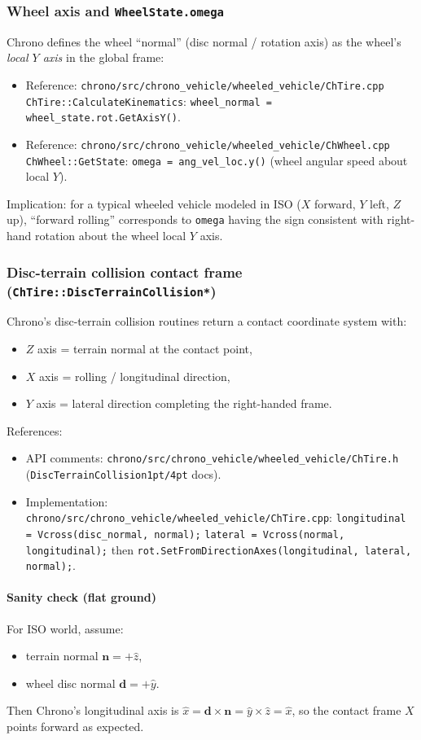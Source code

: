 \subsubsection{Wheel axis and \texttt{WheelState.omega}}
Chrono defines the wheel ``normal'' (disc normal / rotation axis) as the wheel's \emph{local $Y$ axis} in the global frame:
\begin{itemize}
  \item Reference: \texttt{chrono/src/chrono\_vehicle/wheeled\_vehicle/ChTire.cpp} \texttt{ChTire::CalculateKinematics}:
        \texttt{wheel\_normal = wheel\_state.rot.GetAxisY()}.
  \item Reference: \texttt{chrono/src/chrono\_vehicle/wheeled\_vehicle/ChWheel.cpp} \texttt{ChWheel::GetState}:
        \texttt{omega = ang\_vel\_loc.y()} (wheel angular speed about local $Y$).
\end{itemize}
\noindent
Implication: for a typical wheeled vehicle modeled in ISO ($X$ forward, $Y$ left, $Z$ up),
``forward rolling'' corresponds to \texttt{omega} having the sign consistent with right-hand rotation about the wheel local $Y$ axis.

\subsubsection{Disc-terrain collision contact frame (\texttt{ChTire::DiscTerrainCollision*})}
Chrono's disc-terrain collision routines return a contact coordinate system with:
\begin{itemize}
  \item $Z$ axis = terrain normal at the contact point,
  \item $X$ axis = rolling / longitudinal direction,
  \item $Y$ axis = lateral direction completing the right-handed frame.
\end{itemize}
\noindent
References:
\begin{itemize}
  \item API comments: \texttt{chrono/src/chrono\_vehicle/wheeled\_vehicle/ChTire.h} (\texttt{DiscTerrainCollision1pt/4pt} docs).
  \item Implementation: \texttt{chrono/src/chrono\_vehicle/wheeled\_vehicle/ChTire.cpp}:
        \texttt{longitudinal = Vcross(disc\_normal, normal);} \texttt{lateral = Vcross(normal, longitudinal);} then
        \texttt{rot.SetFromDirectionAxes(longitudinal, lateral, normal);}.
\end{itemize}

\paragraph{Sanity check (flat ground)}
For ISO world, assume:
\begin{itemize}
  \item terrain normal $\mathbf{n} = +\hat{z}$,
  \item wheel disc normal $\mathbf{d} = +\hat{y}$.
\end{itemize}
Then Chrono's longitudinal axis is $\hat{x} = \mathbf{d} \times \mathbf{n} = \hat{y} \times \hat{z} = \hat{x}$,
so the contact frame $X$ points forward as expected.


